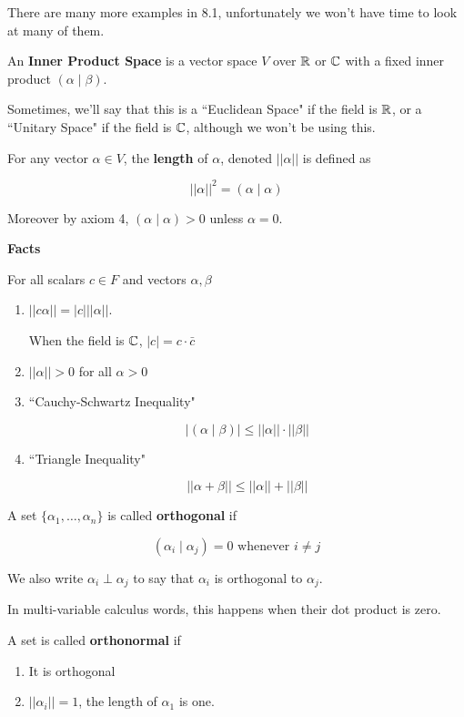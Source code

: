 \documentclass[12pt]{article}
\newcommand{\ip}[2]{\left( #1 \mid #2 \right)}
\begin{document}
  There are many more examples in 8.1, unfortunately we won't have time to look
  at many of them.

  \Definition {}
  {
    An {\bf Inner Product Space} is a vector space $V$ over ${\mathbb R}$ or ${\mathbb C}$ with a
    fixed inner product $\ip{\alpha}{\beta}$.

    Sometimes, we'll say that this is a ``Euclidean Space" if the field is ${\mathbb R}$,
    or a ``Unitary Space" if the field is ${\mathbb C}$, although we won't be using this.
  }


  \Definition {}
  {
    For any vector $\alpha \in V$, the {\bf length} of $\alpha$, denoted
    $||\alpha||$ is defined as

    \[
      ||\alpha||^2 = \ip{\alpha}{\alpha}
    \]

    Moreover by axiom 4, $\ip{\alpha}{\alpha} > 0$ unless $\alpha = 0$.
  }

  {\bf Facts}

  For all scalars $c \in F$ and vectors $\alpha, \beta$

  \begin{enumerate}
    \item $||c \alpha|| = |c| ||\alpha||$.

      When the field is ${\mathbb C}$, $|c| = c \cdot \bar c$

    \item $||\alpha|| > 0$ for all $\alpha > 0$


    \item ``Cauchy-Schwartz Inequality"

      \[
        |\ip{\alpha}{\beta}| \le ||\alpha|| \cdot ||\beta||
      \]

    \item ``Triangle Inequality"

      \[
        ||\alpha + \beta|| \le ||\alpha|| + ||\beta||
      \]
  \end{enumerate}


  \Definition {}
  {
    A set $\{\alpha_1, \dots, \alpha_n\}$ is called {\bf orthogonal} if

    \[
      \ip{\alpha_i}{\alpha_j} = 0 \text{ whenever } i \ne j
    \]

    We also write $\alpha_i \perp \alpha_j$ to say that $\alpha_i$ is orthogonal
    to $\alpha_j$.

    In multi-variable calculus words, this happens when their dot product is
    zero.


    A set is called {\bf orthonormal} if

    \begin{enumerate}
      \item It is orthogonal
      \item $||\alpha_i|| = 1$, the length of $\alpha_1$ is one.
    \end{enumerate}
  }
\end{document}
